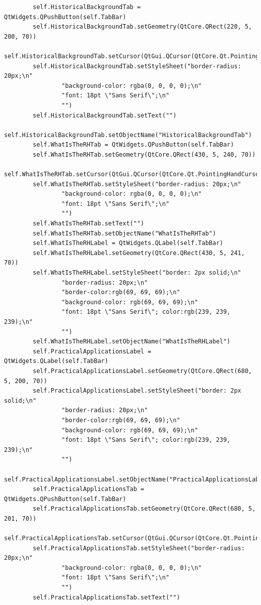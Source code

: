 \documentclass{article}
\begin{document}
\begin{lstlisting}
        self.HistoricalBackgroundTab = QtWidgets.QPushButton(self.TabBar)
        self.HistoricalBackgroundTab.setGeometry(QtCore.QRect(220, 5, 200, 70))
        self.HistoricalBackgroundTab.setCursor(QtGui.QCursor(QtCore.Qt.PointingHandCursor))
        self.HistoricalBackgroundTab.setStyleSheet("border-radius: 20px;\n"
                "background-color: rgba(0, 0, 0, 0);\n"
                "font: 18pt \"Sans Serif\";\n"
                "")
        self.HistoricalBackgroundTab.setText("")
        self.HistoricalBackgroundTab.setObjectName("HistoricalBackgroundTab")
        self.WhatIsTheRHTab = QtWidgets.QPushButton(self.TabBar)
        self.WhatIsTheRHTab.setGeometry(QtCore.QRect(430, 5, 240, 70))
        self.WhatIsTheRHTab.setCursor(QtGui.QCursor(QtCore.Qt.PointingHandCursor))
        self.WhatIsTheRHTab.setStyleSheet("border-radius: 20px;\n"
                "background-color: rgba(0, 0, 0, 0);\n"
                "font: 18pt \"Sans Serif\";\n"
                "")
        self.WhatIsTheRHTab.setText("")
        self.WhatIsTheRHTab.setObjectName("WhatIsTheRHTab")
        self.WhatIsTheRHLabel = QtWidgets.QLabel(self.TabBar)
        self.WhatIsTheRHLabel.setGeometry(QtCore.QRect(430, 5, 241, 70))
        self.WhatIsTheRHLabel.setStyleSheet("border: 2px solid;\n"
                "border-radius: 20px;\n"
                "border-color:rgb(69, 69, 69);\n"
                "background-color: rgb(69, 69, 69);\n"
                "font: 18pt \"Sans Serif\"; color:rgb(239, 239, 239);\n"
                "")
        self.WhatIsTheRHLabel.setObjectName("WhatIsTheRHLabel")
        self.PracticalApplicationsLabel = QtWidgets.QLabel(self.TabBar)
        self.PracticalApplicationsLabel.setGeometry(QtCore.QRect(680, 5, 200, 70))
        self.PracticalApplicationsLabel.setStyleSheet("border: 2px solid;\n"
                "border-radius: 20px;\n"
                "border-color:rgb(69, 69, 69);\n"
                "background-color: rgb(69, 69, 69);\n"
                "font: 18pt \"Sans Serif\"; color:rgb(239, 239, 239);\n"
                "")
        self.PracticalApplicationsLabel.setObjectName("PracticalApplicationsLabel")
        self.PracticalApplicationsTab = QtWidgets.QPushButton(self.TabBar)
        self.PracticalApplicationsTab.setGeometry(QtCore.QRect(680, 5, 201, 70))
        self.PracticalApplicationsTab.setCursor(QtGui.QCursor(QtCore.Qt.PointingHandCursor))
        self.PracticalApplicationsTab.setStyleSheet("border-radius: 20px;\n"
                "background-color: rgba(0, 0, 0, 0);\n"
                "font: 18pt \"Sans Serif\";\n"
                "")
        self.PracticalApplicationsTab.setText("")

\end{lstlisting}
\end{document}
